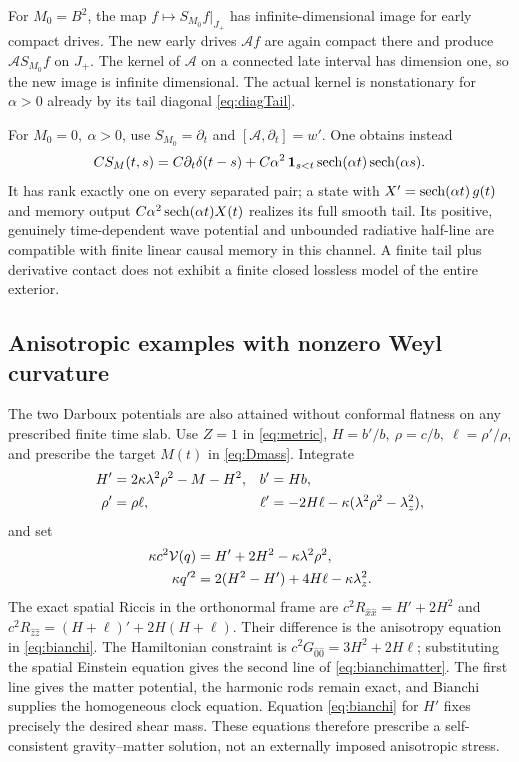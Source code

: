 For \(M_0=B^2\), the map \(f\mapsto S_{M_0}f|_{J_+}\) has infinite-dimensional image for early compact drives. The new early drives \(\mathcal A f\) are again compact there and produce \(\mathcal A S_{M_0}f\) on \(J_+\). The kernel of \(\mathcal A\) on a connected late interval has dimension one, so the new image is infinite dimensional. The actual kernel is nonstationary for \(\alpha>0\) already by its tail diagonal \eqref{eq:diagTail}.

For \(M_0=0,\ \alpha>0\), use \(S_{M_0}=\partial_t\) and \([\mathcal A,\partial_t]=w'\). One obtains instead
\begin{equation}
 CS_M(t,s)=C\partial_t\delta(t-s)
 +C\alpha^2\,{\boldsymbol1}_{s<t}\operatorname{sech}(\alpha t)\operatorname{sech}(\alpha s).
 \label{eq:rankOne}
\end{equation}
It has rank exactly one on every separated pair; a state with
\(X'=\operatorname{sech}(\alpha t)\,g(t)\) and memory output \(C\alpha^2\operatorname{sech}(\alpha t)X(t)\) realizes its full smooth tail. Its positive, genuinely time-dependent wave potential and unbounded radiative half-line are compatible with finite linear causal memory in this channel. A finite tail plus derivative contact does not exhibit a finite closed lossless model of the entire exterior.

\subsection{Anisotropic examples with nonzero Weyl curvature}
The two Darboux potentials are also attained without conformal flatness on any prescribed finite time slab. Use \(Z=1\) in \eqref{eq:metric}, \(H=b'/b,\ \rho=c/b,\ \ell=\rho'/\rho\), and prescribe the target \(M(t)\) in \eqref{eq:Dmass}. Integrate
\begin{align}
  H'&=2\kappa\lambda^2\rho^2-M-H^2,& b'&=Hb,\notag\\
  \rho'&=\rho\ell,&
  \ell'&=-2H\ell-\kappa(\lambda^2\rho^2-\lambda_z^2),
  \label{eq:bianchi}
\end{align}
and set
\begin{align}
 \kappa c^2\mathcal V(q)&=H'+2H^2-\kappa\lambda^2\rho^2,\notag\\
 \kappa q'^2&=2(H^2-H')+4H\ell-\kappa\lambda_z^2.
 \label{eq:bianchimatter}
\end{align}
The exact spatial Riccis in the orthonormal frame are \(c^2R_{\hat x\hat x}=H'+2H^2\) and \(c^2R_{\hat z\hat z}=(H+\ell)'+2H(H+\ell)\). Their difference is the anisotropy equation in \eqref{eq:bianchi}. The Hamiltonian constraint is \(c^2G_{\hat0\hat0}=3H^2+2H\ell\); substituting the spatial Einstein equation gives the second line of \eqref{eq:bianchimatter}. The first line gives the matter potential, the harmonic rods remain exact, and Bianchi supplies the homogeneous clock equation. Equation \eqref{eq:bianchi} for \(H'\) fixes precisely the desired shear mass. These equations therefore prescribe a self-consistent gravity--matter solution, not an externally imposed anisotropic stress.

